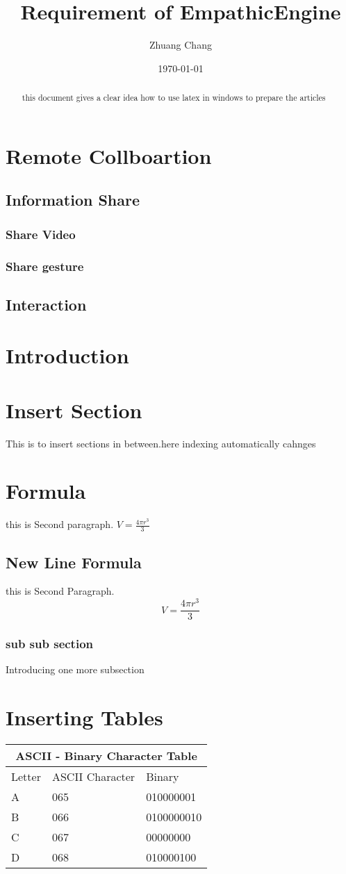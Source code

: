 \documentclass{article}
\begin{document}
\title{Requirement of EmpathicEngine}
\author{Zhuang Chang}
\date{\today}

\maketitle

\begin{abstract}
this document gives a clear idea how to use latex in windows 
to prepare the articles
\end{abstract}

\tableofcontents

\section{Remote Collboartion}
\subsection{Information Share}
\subsubsection{Share Video}
\subsubsection{Share gesture}
\subsection{Interaction}
\section{Introduction}

\section{Insert Section}
This is to insert sections in between.here indexing automatically cahnges

\section{Formula}
this is Second paragraph.
$ V = \frac{4 \pi r^3}{3} $
\subsection{New Line Formula}
this is Second Paragraph.
$$ V = \frac{4 \pi r^3}{3} $$
\subsubsection{sub sub section}
Introducing one more subsection
\section{Inserting Tables}
\begin{tabular}{|p{3cm}|p{3cm}|p{3cm}|}
\hline
\multicolumn{3}{|c|}{ASCII - Binary Character Table}\\
\hline
\hline
Letter & ASCII Character & Binary\\
\hline
A&065&010000001\\
B&066&0100000010\\
C& 067& 00000000\\
D& 068& 010000100\\
\hline

\end{tabular}
\end{document}
